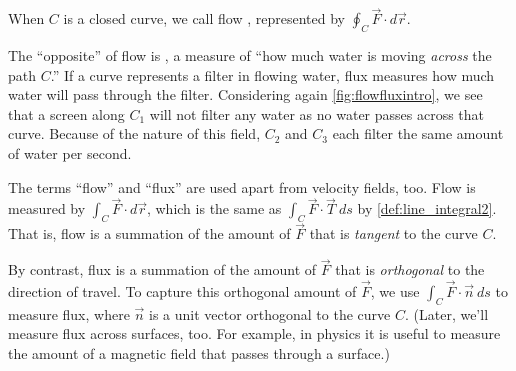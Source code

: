 When $C$ is a closed curve, we call flow , represented by $\oint_C \vec F\cdot d\vec r$.


The ``opposite'' of flow is , a measure of ``how much water is moving \emph{across} the path $C$.'' If a curve represents a filter in flowing water, flux measures how much water will pass through the filter. Considering again \autoref{fig:flowfluxintro}, we see that a screen along $C_1$ will not filter any water as no water passes across that curve. Because of the nature of this field,  $C_2$ and $C_3$ each filter the same amount of water per second. 

The terms ``flow'' and ``flux'' are used apart from velocity fields, too. Flow is measured by $\int_C \vec F\cdot d\vec r$, which is the same as $\int_C \vec F\cdot\vec T\ ds$ by \autoref{def:line_integral2}. That is, flow is a summation of the amount of $\vec F$ that is \emph{tangent} to the curve $C$. %

By contrast, flux is a summation of the amount of $\vec F$ that is \emph{orthogonal} to the direction of travel. To capture this orthogonal amount of $\vec F$, we use $\int_C \vec F \cdot \vec n\ ds$ to measure flux, where $\vec n$ is a unit vector orthogonal to the curve $C$. %
(Later, we'll measure flux across surfaces, too. %
For example, in physics it is useful to measure the amount of a magnetic field that passes through a surface.)


